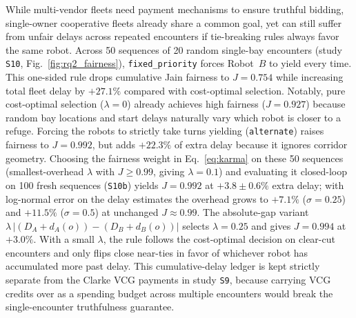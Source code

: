While multi-vendor fleets need payment mechanisms to ensure truthful bidding, single-owner cooperative fleets already share a common goal, yet can still suffer from unfair delays across repeated encounters if tie-breaking rules always favor the same robot. Across 50 sequences of 20 random single-bay encounters (study \texttt{S10}, Fig.~\ref{fig:rq2_fairness}), \texttt{fixed\_priority} forces Robot~$B$ to yield every time. This one-sided rule drops cumulative Jain fairness to $J=0.754$ while increasing total fleet delay by $+27.1\%$ compared with cost-optimal selection. Notably, pure cost-optimal selection ($\lambda=0$) already achieves high fairness ($J=0.927$) because random bay locations and start delays naturally vary which robot is closer to a refuge. Forcing the robots to strictly take turns yielding (\texttt{alternate}) raises fairness to $J=0.992$, but adds $+22.3\%$ of extra delay because it ignores corridor geometry. Choosing the fairness weight in Eq.~\eqref{eq:karma} on these 50 sequences (smallest-overhead $\lambda$ with $J\ge0.99$, giving $\lambda=0.1$) and evaluating it closed-loop on 100 fresh sequences (\texttt{S10b}) yields $J=0.992$ at $+3.8\pm0.6\%$ extra delay; with log-normal error on the delay estimates the overhead grows to $+7.1\%$ ($\sigma=0.25$) and $+11.5\%$ ($\sigma=0.5$) at unchanged $J\approx0.99$. The absolute-gap variant $\lambda\,|(D_A+d_A(o))-(D_B+d_B(o))|$ selects $\lambda=0.25$ and gives $J=0.994$ at $+3.0\%$. With a small $\lambda$, the rule follows the cost-optimal decision on clear-cut encounters and only flips close near-ties in favor of whichever robot has accumulated more past delay. This cumulative-delay ledger is kept strictly separate from the Clarke VCG payments in study \texttt{S9}, because carrying VCG credits over as a spending budget across multiple encounters would break the single-encounter truthfulness guarantee.


